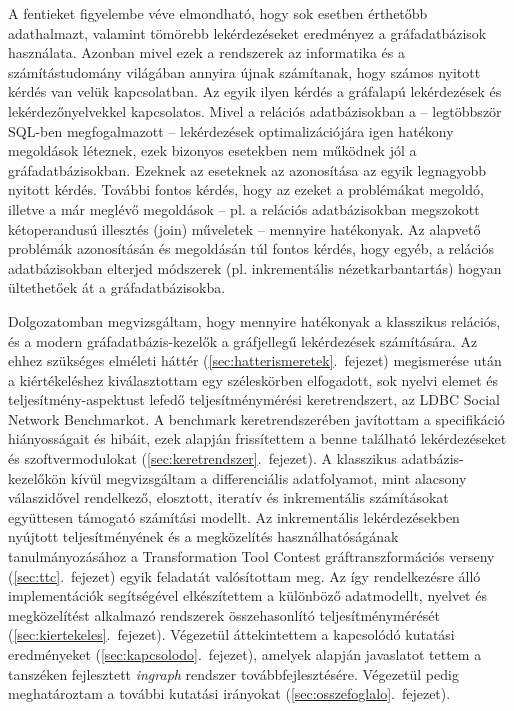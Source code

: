 A fentieket figyelembe véve elmondható, hogy sok esetben érthetőbb adathalmazt, valamint tömörebb lekérdezéseket eredményez a gráfadatbázisok használata. Azonban mivel ezek a rendszerek az informatika és a számítástudomány világában annyira újnak számítanak, hogy számos nyitott kérdés van velük kapcsolatban. Az egyik ilyen kérdés a gráfalapú lekérdezések és lekérdezőnyelvekkel kapcsolatos. Mivel a relációs adatbázisokban a -- legtöbbször SQL-ben megfogalmazott -- lekérdezések optimalizációjára igen hatékony megoldások léteznek, ezek bizonyos esetekben nem működnek jól a gráfadatbázisokban. Ezeknek az eseteknek az azonosítása az egyik legnagyobb nyitott kérdés. További fontos kérdés, hogy az ezeket a problémákat megoldó, illetve a már meglévő megoldások -- pl. a relációs adatbázisokban megszokott kétoperandusú illesztés (join) műveletek -- mennyire hatékonyak. Az alapvető problémák azonosításán és megoldásán túl fontos kérdés, hogy egyéb, a relációs adatbázisokban elterjed módszerek (pl. inkrementális nézetkarbantartás) hogyan ültethetőek át a gráfadatbázisokba.

Dolgozatomban megvizsgáltam, hogy mennyire hatékonyak a klasszikus relációs, és a modern gráfadatbázis-kezelők a gráfjellegű lekérdezések számítására.
Az ehhez szükséges elméleti háttér (\ref{sec:hatterismeretek}.~fejezet) megismerése után a kiértékeléshez kiválasztottam egy széleskörben elfogadott, sok nyelvi elemet és teljesítmény-aspektust lefedő teljesítménymérési keretrendszert, az LDBC Social Network Benchmarkot. A benchmark keretrendszerében javítottam a specifikáció hiányosságait és hibáit, ezek alapján frissítettem a benne található lekérdezéseket és szoftvermodulokat (\ref{sec:keretrendszer}.~fejezet).
A klasszikus adatbázis-kezelőkön kívül megvizsgáltam a differenciális adatfolyamot, mint alacsony válaszidővel rendelkező, elosztott, iteratív és inkrementális számításokat együttesen támogató számítási modellt. Az inkrementális lekérdezésekben nyújtott teljesítményének és a megközelítés használhatóságának tanulmányozásához a Transformation Tool Contest gráftranszformációs verseny (\ref{sec:ttc}.~fejezet) egyik feladatát valósítottam meg.
Az így rendelkezésre álló implementációk segítségével elkészítettem a különböző adatmodellt, nyelvet és megközelítést alkalmazó rendszerek összehasonlító teljesítménymérését (\ref{sec:kiertekeles}.~fejezet).
Végezetül áttekintettem a kapcsolódó kutatási eredményeket (\ref{sec:kapcsolodo}.~fejezet), amelyek alapján javaslatot tettem a tanszéken fejlesztett \emph{ingraph} rendszer továbbfejlesztésére. Végezetül pedig meghatároztam a további kutatási irányokat (\ref{sec:osszefoglalo}.~fejezet).
